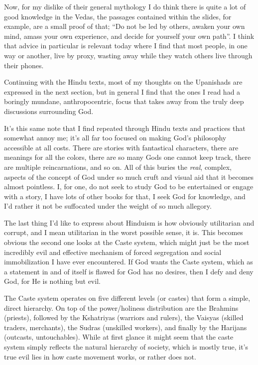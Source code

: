\documentclass[12pt,letterpaper]{article}
\begin{document}
\begin{spacing}{2}
    Now, for my dislike of their general mythology I do think there is quite a
    lot of good knowledge in the Vedas, the passages contained within the
    slides, for example, are a small proof of that; ``Do not be led by others,
    awaken your own mind, amass your own experience, and decide for yourself
    your own path''. I think that advice in particular is relevant today where I
    find that most people, in one way or another, live by proxy, wasting away
    while they watch others live through their phones.

    Continuing with the Hindu texts, most of my thoughts on the Upanishads are
    expressed in the next section, but in general I find that the ones I read
    had a boringly mundane, anthropocentric, focus that takes away from the
    truly deep discussions surrounding God.

    It's this same note that I find repeated through Hindu texts and practices
    that somewhat annoy me; it's all far too focused on making God's philosophy
    accessible at all costs. There are stories with fantastical characters,
    there are meanings for all the colors, there are so many Gods one cannot
    keep track, there are multiple reincarnations, and so on. All of this buries
    the \emph{real}, complex, aspects of the concept of God under so much cruft
    and visual aid that it becomes almost pointless. I, for one, do not seek to
    study God to be entertained or engage with a story, I have lots of other
    books for that, I seek God for knowledge, and I'd rather it not be
    suffocated under the weight of so much allegory.

    The last thing I'd like to express about Hinduism is how obviously
    utilitarian and corrupt, and I mean utilitarian in the worst possible sense,
    it is. This becomes obvious the second one looks at the Caste system, which
    might just be the most incredibly evil and effective mechanism of forced
    segregation and social immobilization I have ever encountered. If God wants
    the Caste system, which as a statement in and of itself is flawed for God
    has no desires, then I defy and deny God, for He is nothing but evil.

    The Caste system operates on five different levels (or castes) that form a
    simple, direct hierarchy. On top of the power/holiness distribution are the
    Brahmins (priests), followed by the Kshatriyas (warriors and rulers), the
    Vaisyas (skilled traders, merchants), the Sudras (unskilled workers), and
    finally by the Harijans (outcasts, untouchables). While at first glance it
    might seem that the caste system simply reflects the natural hierarchy of
    society, which is mostly true, it's true evil lies in how caste movement
    works, or rather does not.


\end{spacing}
\end{document}
